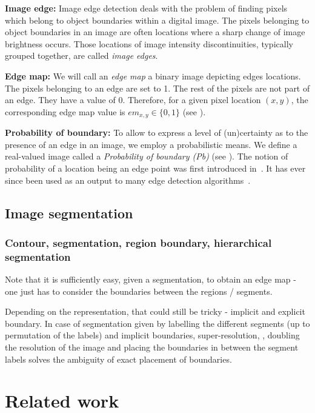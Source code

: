 \textbf{Image edge:} Image edge detection deals with the problem of finding pixels which belong to object boundaries within a digital image. The pixels belonging to object boundaries in an image are often locations where a sharp change of image brightness occurs. Those locations of image intensity discontinuities, typically grouped together, are called \textit{image edges}.

\textbf{Edge map:} We will call an \textit{edge map} a binary image depicting edges locations. The pixels belonging to an edge are set to 1. The rest of the pixels are not part of an edge. They have a value of 0. Therefore, for a given pixel location $(x,y)$, the corresponding edge map value is $em_{x,y} \in \{0,1\}$ (see ).

\textbf{Probability of boundary:} To allow to express a level of (un)certainty as to the presence of an edge in an image, we employ a probabilistic means. We define a real-valued image called a \textit{Probability of boundary (Pb)} (see ). 
The notion of probability of a location being an edge point was first introduced in~\cite{martin2004learning}. %
It has ever since been used as an output to many edge detection algorithms~\cite{Maire2008using,LimZD13,DollarICCV13edges,Isola2014crisp,Ganin2014n4fields,Hallman2014}.

\subsection{Image segmentation}

\subsubsection*{Contour, segmentation, region boundary, hierarchical segmentation}

Note that it is sufficiently easy, given a segmentation, to obtain an edge map - one just has to consider the boundaries between the regions / segments. %

Depending on the representation, that could still be tricky - implicit and explicit boundary. In case of segmentation given by labelling the different segments (up to permutation of the labels) and implicit boundaries, super-resolution, \ie, doubling the resolution of the image and placing the boundaries in between the segment labels solves the ambiguity of exact placement of boundaries.

\section{Related work}
